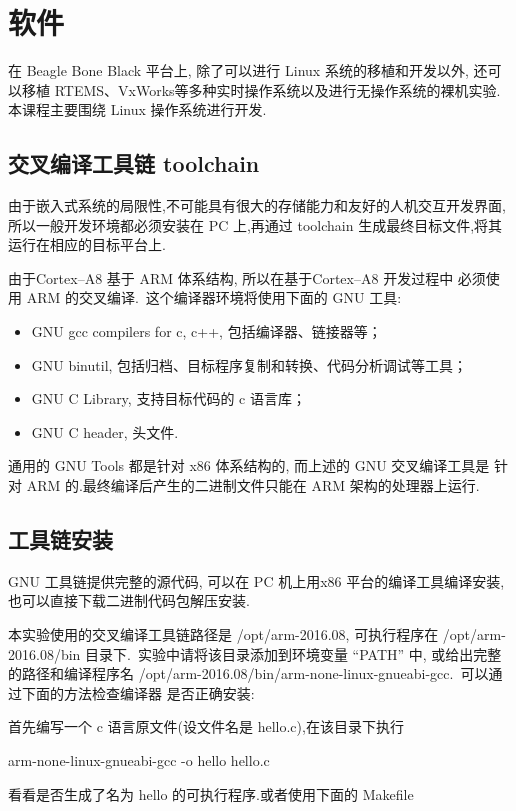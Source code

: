 \section{软件}

	在 Beagle Bone Black 平台上, 除了可以进行 Linux 系统的移植和开发以外,
还可以移植 RTEMS、VxWorks等多种实时操作系统以及进行无操作系统的裸机实验.
本课程主要围绕 Linux 操作系统进行开发.

\subsection{交叉编译工具链 toolchain}
	由于嵌入式系统的局限性,不可能具有很大的存储能力和友好的人机交互开发界面,
所以一般开发环境都必须安装在 PC 上,再通过 toolchain 生成最终目标文件,将其
运行在相应的目标平台上.

	由于Cortex--A8 基于 ARM 体系结构, 所以在基于Cortex--A8 开发过程中
必须使用 ARM 的交叉编译.~这个编译器环境将使用下面的 GNU 工具:
\begin{itemize}\itemsep=-3pt
  \item GNU gcc compilers for c, c++, 包括编译器、链接器等；
  \item GNU binutil, 包括归档、目标程序复制和转换、代码分析调试等工具；
  \item GNU C Library, 支持目标代码的 c 语言库；
  \item GNU C header, 头文件.
\end{itemize}
	通用的 GNU Tools 都是针对 x86 体系结构的, 而上述的 GNU 交叉编译工具是
针对 ARM 的.最终编译后产生的二进制文件只能在 ARM 架构的处理器上运行.

\subsection{工具链安装}
	GNU 工具链提供完整的源代码, 可以在 PC 机上用x86 平台的编译工具编译安装,
也可以直接下载二进制代码包解压安装.

	本实验使用的交叉编译工具链路径是 /opt/arm-2016.08, 可执行程序在
 /opt/arm-2016.08/bin 目录下.~实验中请将该目录添加到环境变量 ``PATH''
中, 或给出完整的路径和编译程序名
/opt/arm-2016.08/bin/arm-none-linux-gnueabi-gcc.~可以通过下面的方法检查编译器
是否正确安装:

    首先编写一个 c 语言原文件(设文件名是 hello.c),在该目录下执行

    arm-none-linux-gnueabi-gcc -o hello hello.c

    看看是否生成了名为 hello 的可执行程序.或者使用下面的 Makefile

